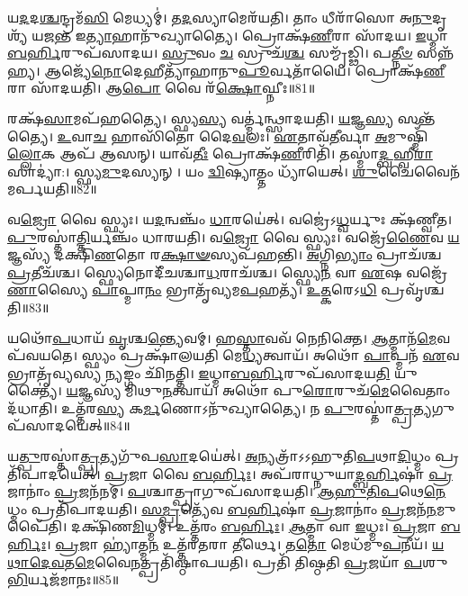 𑌯\-\ul{𑌦}\-𑌦\-\ul{𑌶𑍍𑌚}\-𑌨𑍍𑌦𑍍𑌰𑌮᳴\-\ul{𑌸𑌿} 𑌮𑍇𑌧𑍍𑌯𑌮𑍍॑।
𑌤\-\ul{𑌦}\-𑌸𑍍𑌯𑌾𑌮𑍇𑌰᳴𑌯𑌤𑌿।
𑌤𑌾𑌂 𑌧𑍀𑌰𑌾᳴𑌸𑍋 𑌅\-\ul{𑌨𑍁}\-𑌦𑍃𑌶𑍍𑌯᳴ 𑌯𑌜\-\ul{𑌨𑍍𑌤} 𑌇\-\ul{𑌤𑍍𑌯𑌾}\-𑌹𑌾𑌨𑍁᳴𑌖𑍍𑌯𑌾𑌤𑍍𑌯𑍈।
𑌪𑍍𑌰𑍋𑌕𑍍𑌷᳴\-\ul{𑌣𑍀}\-𑌰𑌾 𑌸𑌾᳴𑌦𑌯।
\-\ul{𑌇}\-𑌧𑍍𑌮𑌾\-\ul{𑌬}\-\-\ul{𑌰𑍍}\-\mbox{}𑌹𑌿𑌰𑍁𑌪᳴𑌸𑌾𑌦𑌯।
\-\ul{𑌸𑍍𑌰𑍁}\-𑌵𑌂 \ul{𑌚} 𑌸𑍍𑌰𑍁𑌚᳴\-\ul{𑌶𑍍𑌚} 𑌸𑌮𑍍𑌮𑍃᳴𑌡𑍍𑌢𑌿।
𑌪\-\ul{𑌤𑍍𑌨𑍀}\-\-\ul{𑍞} 𑌸𑌨𑍍𑌨᳴𑌹𑍍𑌯।
𑌆𑌜𑍍𑌯𑍇᳴\-\ul{𑌨𑍋}\-𑌦𑍇𑌹𑍀𑌤𑍍𑌯𑌾᳴𑌹𑌾𑌨𑍁\-\ul{𑌪𑍂}\-𑌰𑍍𑌵𑌤𑌾᳴𑌯𑍈।
𑌪𑍍𑌰𑍋𑌕𑍍𑌷᳴\-\ul{𑌣𑍀}\-𑌰𑌾 𑌸𑌾᳴𑌦𑌯𑌤𑌿।
𑌆\-\ul{𑌪𑍋} 𑌵𑍈 𑌰᳴\-\ul{𑌕𑍍𑌷𑍋}\-𑌘𑍍𑌨𑍀𑌃॥81॥

𑌰𑌕𑍍𑌷᳴\-\ul{𑌸𑌾}\-𑌮𑌪᳴𑌹𑌤𑍍𑌯𑍈।
𑌸𑍍𑌫𑍍𑌯\-\ul{𑌸𑍍𑌯} 𑌵𑌰𑍍𑌤𑍍𑌮॑𑌨𑍍𑌥𑍍𑌸𑌾𑌦𑌯𑌤𑌿।
\-\ul{𑌯}\-𑌜𑍍𑌞\-\ul{𑌸𑍍𑌯} 𑌸𑌨𑍍𑌤᳴𑌤𑍍𑌯𑍈।
\-\ul{𑌉}\-𑌵𑌾\-\ul{𑌚} 𑌹𑌾𑌸𑌿᳴𑌤𑍋 𑌦𑍈\-\ul{𑌵}\-𑌲𑌃।
\-\ul{𑌏}\-𑌤𑌾𑌵᳴\-\ul{𑌤𑍀}\-𑌰𑍍𑌵𑌾 \ul{𑌅}\-𑌮𑍁𑌷𑍍𑌮𑌿𑌁᳴\-\ul{𑌲𑍍𑌲𑍋}\-𑌕 𑌆𑌪᳴ 𑌆𑌸𑌨𑍍।
𑌯𑌾𑌵᳴\-\ul{𑌤𑍀𑌃} 𑌪𑍍𑌰𑍋𑌕𑍍𑌷᳴\-\ul{𑌣𑍀}\-𑌰𑌿𑌤𑌿᳴।
𑌤𑌸𑍍𑌮𑌾॑\-\ul{𑌦𑍍𑌬}\-𑌹𑍍𑌵𑍀\-\ul{𑌰𑌾}\-𑌸𑌾𑌦𑍍𑌯𑌾॑:।
𑌸𑍍𑌫𑍍𑌯\-\ul{𑌮𑍁}\-𑌦𑌸𑍍𑌯𑌨𑍍।
𑌯𑌂 \ul{𑌦𑍍𑌵𑌿}\-𑌷𑍍𑌯𑌾𑌤𑍍𑌤𑌂 𑌧𑍍𑌯𑌾᳴𑌯𑍇𑌤𑍍।
\-\ul{𑌶𑍁}\-𑌚𑍈𑌵𑍈𑌨᳴𑌮𑌰𑍍𑌪𑌯𑌤𑌿॥82॥

𑌵\-\ul{𑌜𑍍𑌰𑍋} 𑌵𑍈 𑌸𑍍𑌫𑍍𑌯𑌃।
𑌯\-\ul{𑌦}\-𑌨𑍍𑌵𑌞𑍍𑌚𑌂᳴ \ul{𑌧𑌾}\-𑌰𑌯𑍇॑𑌤𑍍।
𑌵𑌜𑍍𑌰𑍇॑\-𑌽\-\ul{𑌧𑍍𑌵}\-𑌰𑍍𑌯𑍁𑌃 𑌕𑍍𑌷᳴𑌣𑍍𑌵𑍀𑌤।
\-\ul{𑌪𑍁}\-𑌰𑌸𑍍𑌤𑌾॑\-\ul{𑌤𑍍𑌤𑌿}\-𑌰𑍍𑌯𑌞𑍍𑌚𑌂᳴ 𑌧𑌾𑌰𑌯𑌤𑌿।
𑌵\-\ul{𑌜𑍍𑌰𑍋} 𑌵𑍈 𑌸𑍍𑌫𑍍𑌯𑌃।
𑌵𑌜𑍍𑌰𑍇᳴\-\ul{𑌣𑍈}\-𑌵 \ul{𑌯}\-𑌜𑍍𑌞𑌸𑍍𑌯᳴ 𑌦𑌕𑍍𑌷𑌿\-\ul{𑌣}\-𑌤𑍋 𑌰\-\ul{𑌕𑍍𑌷𑌾}\-\-\ul{𑍟}\-𑌸𑍍𑌯𑌪᳴𑌹𑌨𑍍𑌤𑌿।
\-\ul{𑌅}\-𑌗𑍍𑌨𑌿\-\ul{𑌭𑍍𑌯𑌾𑌂} 𑌪𑍍𑌰𑌾𑌚᳴𑌶𑍍𑌚 \ul{𑌪𑍍𑌰}\-𑌤𑍀𑌚᳴𑌶𑍍𑌚।
𑌸𑍍𑌫𑍍𑌯𑍇𑌨𑍋𑌦𑍀᳴𑌚𑌶𑍍𑌚𑌾\-\ul{𑌧}\-𑌰𑌾𑌚᳴𑌶𑍍𑌚।
𑌸𑍍𑌫𑍍𑌯𑍇\-\ul{𑌨} 𑌵𑌾 \ul{𑌏}\-𑌷 𑌵𑌜𑍍𑌰𑍇᳴\-\ul{𑌣𑌾}\-𑌸𑍍𑌯𑍈 \ul{𑌪𑌾}\-𑌪𑍍𑌮𑌾\-\ul{𑌨𑌂} 𑌭𑍍𑌰𑌾𑌤𑍃᳴𑌵𑍍𑌯𑌮\-\ul{𑌪}\-𑌹𑌤𑍍𑌯᳴।
\-\ul{𑌉}\-\-\ul{𑌤𑍍𑌕}\-𑌰𑍇𑌽\-\ul{𑌧𑌿} 𑌪𑍍𑌰𑌵𑍃᳴𑌶𑍍𑌚𑌤𑌿॥83॥

𑌯𑌥𑍋᳴\-\ul{𑌪}\-𑌧𑌾𑌯᳴ \ul{𑌵𑍃}\-𑌶𑍍𑌚\-\ul{𑌨𑍍𑌤𑍍𑌯𑍇}\-𑌵𑌮𑍍।
𑌹\-\ul{𑌸𑍍𑌤𑌾}\-𑌵𑌵᳴ 𑌨𑍇𑌨𑌿𑌕𑍍𑌤𑍇।
\-\ul{𑌆}\-𑌤𑍍𑌮𑌾𑌨᳴\-\ul{𑌮𑍇}\-𑌵 𑌪᳴𑌵𑌯𑌤𑍇।
𑌸𑍍𑌫𑍍𑌯𑌂 𑌪𑍍𑌰𑌕𑍍𑌷𑌾᳴𑌲𑌯𑌤𑌿 𑌮𑍇\-\ul{𑌧𑍍𑌯}\-𑌤𑍍𑌵𑌾𑌯᳴।
𑌅𑌥𑍋᳴ \ul{𑌪𑌾}\-𑌪𑍍𑌮𑌨᳴ \ul{𑌏}\-𑌵 𑌭𑍍𑌰𑌾𑌤𑍃᳴𑌵𑍍𑌯𑌸𑍍𑌯 \ul{𑌨𑍍𑌯}\-𑌙𑍍𑌗𑌂 𑌛𑌿᳴𑌨𑌤𑍍𑌤𑌿।
\-\ul{𑌇}\-𑌧𑍍𑌮𑌾\-\ul{𑌬}\-\-\ul{𑌰𑍍}\-\mbox{}𑌹𑌿𑌰𑍁𑌪᳴𑌸𑌾𑌦𑌯\-\ul{𑌤𑌿} 𑌯𑍁𑌕𑍍𑌤𑍍𑌯𑍈॑।
\-\ul{𑌯}\-𑌜𑍍𑌞𑌸𑍍𑌯᳴ 𑌮𑌿𑌥𑍁\-\ul{𑌨}\-𑌤𑍍𑌵𑌾𑌯᳴।
𑌅𑌥𑍋᳴ 𑌪𑍁\-\ul{𑌰𑍋}\-𑌰𑍁𑌚᳴\-\ul{𑌮𑍇}\-𑌵𑍈𑌤𑌾𑌂 𑌦᳴𑌧𑌾𑌤𑌿।
𑌉𑌤𑍍𑌤᳴𑌰\-\ul{𑌸𑍍𑌯} 𑌕\-\ul{𑌰𑍍𑌮}\-𑌣𑍋\-𑌽𑌨𑍁᳴𑌖𑍍𑌯𑌾𑌤𑍍𑌯𑍈।
𑌨 \ul{𑌪𑍁}\-𑌰𑌸𑍍𑌤𑌾॑\-\ul{𑌤𑍍𑌪𑍍𑌰}\-𑌤𑍍𑌯𑌗𑍁𑌪᳴𑌸𑌾𑌦𑌯𑍇𑌤𑍍॥84॥

𑌯\-\ul{𑌤𑍍𑌪𑍁}\-𑌰𑌸𑍍𑌤𑌾॑\-\ul{𑌤𑍍𑌪𑍍𑌰}\-𑌤𑍍𑌯𑌗𑍁᳴𑌪\-\ul{𑌸𑌾}\-𑌦𑌯𑍇॑𑌤𑍍।
\-\ul{𑌅}\-𑌨𑍍𑌯𑌤𑍍𑌰𑌾᳴𑌽𑌽𑌹𑍁𑌤𑌿\-\ul{𑌪}\-𑌥𑌾\-\ul{𑌦𑌿}\-𑌧𑍍𑌮𑌂 𑌪𑍍𑌰𑌤𑌿᳴\-𑌪𑌾𑌦𑌯𑍇𑌤𑍍।
\-\ul{𑌪𑍍𑌰}\-𑌜𑌾 𑌵𑍈 \ul{𑌬}\-\-\ul{𑌰𑍍}\-𑌹𑌿𑌃।
𑌅𑌪᳴𑌰𑌾𑌧𑍍𑌨𑍁𑌯𑌾\-\ul{𑌦𑍍𑌬}\-\-\ul{𑌰𑍍}\-𑌹𑌿𑌷𑌾॑ \ul{𑌪𑍍𑌰}\-𑌜𑌾𑌨𑌾𑌂॑ \ul{𑌪𑍍𑌰}\-𑌜𑌨᳴𑌨𑌮𑍍।
\-\ul{𑌪}\-𑌶𑍍𑌚𑌾𑌤𑍍𑌪𑍍𑌰𑌾𑌗𑍁𑌪᳴𑌸𑌾𑌦𑌯𑌤𑌿।
\-\ul{𑌆}\-\-\ul{𑌹𑍁}\-\-\ul{𑌤𑌿}\-\-\ul{𑌪}\-𑌥𑍇\-\ul{𑌨𑍇}\-𑌧𑍍𑌮𑌂 𑌪𑍍𑌰𑌤𑌿᳴\-𑌪𑌾𑌦𑌯𑌤𑌿।
\-\ul{𑌸}\-\-\ul{𑌮𑍍𑌪𑍍𑌰}\-𑌤𑍍𑌯𑍇᳴𑌵 \ul{𑌬}\-\-\ul{𑌰𑍍}\-𑌹𑌿𑌷𑌾॑ \ul{𑌪𑍍𑌰}\-𑌜𑌾𑌨𑌾𑌂॑ \ul{𑌪𑍍𑌰}\-𑌜𑌨᳴\-\ul{𑌨}\-𑌮𑍁𑌪𑍈᳴𑌤𑌿।
𑌦𑌕𑍍𑌷𑌿᳴𑌣\-\ul{𑌮𑌿}\-𑌧𑍍𑌮𑌮𑍍।
𑌉𑌤𑍍𑌤᳴𑌰𑌂 \ul{𑌬}\-\-\ul{𑌰𑍍}\-𑌹𑌿𑌃।
\-\ul{𑌆}\-𑌤𑍍𑌮𑌾 𑌵𑌾 \ul{𑌇}\-𑌧𑍍𑌮𑌃।
\-\ul{𑌪𑍍𑌰}\-𑌜𑌾 \ul{𑌬}\-\-\ul{𑌰𑍍}\-𑌹𑌿𑌃।
\-\ul{𑌪𑍍𑌰}\-𑌜𑌾 𑌹𑍍𑌯𑌾॑𑌤𑍍𑌮\-\ul{𑌨} 𑌉𑌤𑍍𑌤᳴𑌰𑌤𑌰𑌾 \ul{𑌤𑍀}\-𑌰𑍍𑌥𑍇।
𑌤\-\ul{𑌤𑍋} 𑌮𑍇𑌧᳴𑌮𑍁\-\ul{𑌪}\-𑌨𑍀𑌯᳴।
\-\ul{𑌯}\-\-\ul{𑌥𑌾}\-\-\ul{𑌦𑍇}\-\-\ul{𑌵}\-𑌤\-\ul{𑌮𑍇}\-𑌵𑍈\-\ul{𑌨}\-𑌤𑍍𑌪𑍍𑌰𑌤𑌿᳴\-𑌷𑍍𑌠𑌾𑌪𑌯𑌤𑌿।
𑌪𑍍𑌰𑌤𑌿᳴ 𑌤𑌿𑌷𑍍𑌠𑌤𑌿 \ul{𑌪𑍍𑌰}\-𑌜𑌯𑌾᳴ \ul{𑌪}\-𑌶𑍁\-\ul{𑌭𑌿}\-𑌰𑍍𑌯𑌜᳴𑌮𑌾𑌨𑌃॥85॥\anuvakamend[\-\ul{𑌵𑍃}\-\-\ul{𑌶𑍍𑌚}\-\-\ul{𑌤𑌿} \ul{𑌸𑌾}\-\-\ul{𑌦}\-\-\ul{𑌯𑍇}\-\-\ul{𑌦𑌿}\-𑌧𑍍𑌮𑌃 𑌪𑌞𑍍𑌚᳴ 𑌚]





